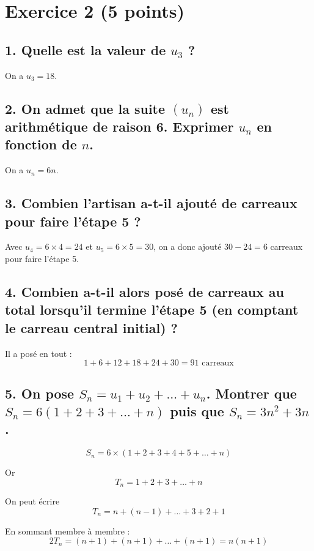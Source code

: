 \section*{Exercice 2 (5 points)}
	

	
	\subsection*{1. Quelle est la valeur de $u_3$ ?}
	
	On a $u_3 = 18$.
	
	\subsection*{2. On admet que la suite $(u_n)$ est arithmétique de raison 6. Exprimer $u_n$ en fonction de $n$.}
	
	On a $u_n = 6n$.
	
	\subsection*{3. Combien l’artisan a-t-il ajouté de carreaux pour faire l’étape 5 ?}
	
	Avec $u_4 = 6 \times 4 = 24$ et $u_5 = 6 \times 5 = 30$, on a donc ajouté $30 - 24 = 6$ carreaux pour faire l’étape 5.
	
	\subsection*{4. Combien a-t-il alors posé de carreaux au total lorsqu’il termine l’étape 5 (en comptant le carreau central initial) ?}
	
	Il a posé en tout :
	\[
	1 + 6 + 12 + 18 + 24 + 30 = 91 \text{ carreaux}
	\]
	
	\subsection*{5. On pose $S_n = u_1 + u_2 + \dots + u_n$. Montrer que $S_n = 6(1 + 2 + 3 + \dots + n)$ puis que $S_n = 3n^2 + 3n$.}
	
	\[
	S_n = 6 \times (1 + 2 + 3 + 4 + 5 + \dots + n)
	\]
	
	Or
	\[
	T_n = 1 + 2 + 3 + \dots + n
	\]
	
	On peut écrire
	\[
	T_n = n + (n-1) + \dots + 3 + 2 + 1
	\]
	
	En sommant membre à membre :
	\[
	2T_n = (n+1) + (n+1) + \dots + (n+1) = n(n+1)
	\]
	
